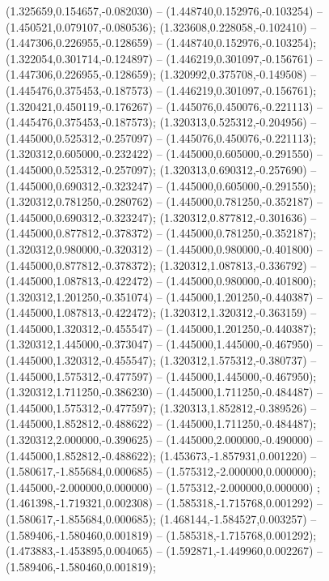  (1.325659,0.154657,-0.082030) -- (1.448740,0.152976,-0.103254) -- (1.450521,0.079107,-0.080536);
 (1.323608,0.228058,-0.102410) -- (1.447306,0.226955,-0.128659) -- (1.448740,0.152976,-0.103254);
 (1.322054,0.301714,-0.124897) -- (1.446219,0.301097,-0.156761) -- (1.447306,0.226955,-0.128659);
 (1.320992,0.375708,-0.149508) -- (1.445476,0.375453,-0.187573) -- (1.446219,0.301097,-0.156761);
 (1.320421,0.450119,-0.176267) -- (1.445076,0.450076,-0.221113) -- (1.445476,0.375453,-0.187573);
 (1.320313,0.525312,-0.204956) -- (1.445000,0.525312,-0.257097) -- (1.445076,0.450076,-0.221113);
 (1.320312,0.605000,-0.232422) -- (1.445000,0.605000,-0.291550) -- (1.445000,0.525312,-0.257097);
 (1.320313,0.690312,-0.257690) -- (1.445000,0.690312,-0.323247) -- (1.445000,0.605000,-0.291550);
 (1.320312,0.781250,-0.280762) -- (1.445000,0.781250,-0.352187) -- (1.445000,0.690312,-0.323247);
 (1.320312,0.877812,-0.301636) -- (1.445000,0.877812,-0.378372) -- (1.445000,0.781250,-0.352187);
 (1.320312,0.980000,-0.320312) -- (1.445000,0.980000,-0.401800) -- (1.445000,0.877812,-0.378372);
 (1.320312,1.087813,-0.336792) -- (1.445000,1.087813,-0.422472) -- (1.445000,0.980000,-0.401800);
 (1.320312,1.201250,-0.351074) -- (1.445000,1.201250,-0.440387) -- (1.445000,1.087813,-0.422472);
 (1.320312,1.320312,-0.363159) -- (1.445000,1.320312,-0.455547) -- (1.445000,1.201250,-0.440387);
 (1.320312,1.445000,-0.373047) -- (1.445000,1.445000,-0.467950) -- (1.445000,1.320312,-0.455547);
 (1.320312,1.575312,-0.380737) -- (1.445000,1.575312,-0.477597) -- (1.445000,1.445000,-0.467950);
 (1.320312,1.711250,-0.386230) -- (1.445000,1.711250,-0.484487) -- (1.445000,1.575312,-0.477597);
 (1.320313,1.852812,-0.389526) -- (1.445000,1.852812,-0.488622) -- (1.445000,1.711250,-0.484487);
 (1.320312,2.000000,-0.390625) -- (1.445000,2.000000,-0.490000) -- (1.445000,1.852812,-0.488622);
 (1.453673,-1.857931,0.001220) -- (1.580617,-1.855684,0.000685) -- (1.575312,-2.000000,0.000000);
 (1.445000,-2.000000,0.000000) -- (1.575312,-2.000000,0.000000) ;
 (1.461398,-1.719321,0.002308) -- (1.585318,-1.715768,0.001292) -- (1.580617,-1.855684,0.000685);
 (1.468144,-1.584527,0.003257) -- (1.589406,-1.580460,0.001819) -- (1.585318,-1.715768,0.001292);
 (1.473883,-1.453895,0.004065) -- (1.592871,-1.449960,0.002267) -- (1.589406,-1.580460,0.001819);
